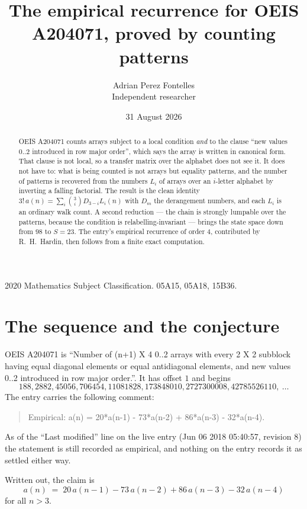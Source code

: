 \documentclass[11pt,a4paper]{article}
\title{The empirical recurrence for OEIS A204071, proved by counting patterns}
\author{Adrian Perez Fontelles\\ \small Independent researcher}
\date{31 August 2026}
\theoremstyle{plain}
\theoremstyle{definition}
\begin{document}
\maketitle

\begin{abstract}
OEIS A204071 counts arrays subject to a local condition \emph{and} to the clause ``new values
$0..2$ introduced in row major order'', which says the array is written in canonical
form. That clause is not local, so a transfer matrix over the alphabet does not see it. It
does not have to: what is being counted is not arrays but equality patterns, and the number
of patterns is recovered from the numbers $L_i$ of arrays over an $i$-letter alphabet by
inverting a falling factorial. The result is the clean identity
$3!\,a(n)=\sum_i\binom{3}{i}D_{3-i}L_i(n)$ with $D_m$ the derangement numbers,
and each $L_i$ is an ordinary walk count. A second reduction --- the chain is strongly
lumpable over the patterns, because the condition is relabelling-invariant --- brings the
state space down from $98$ to $S=23$. The entry's empirical recurrence of order
$4$, contributed by R.~H.~Hardin, then follows from a finite exact computation.
\end{abstract}

\noindent\small 2020 Mathematics Subject Classification. 05A15, 05A18, 15B36.\normalsize

\section{The sequence and the conjecture}

OEIS A204071 is ``Number of (n+1) X 4 0..2 arrays with every 2 X 2 subblock having equal diagonal elements or equal antidiagonal elements, and new values 0..2 introduced in row major order.''. It has offset $1$ and begins
\[
188, 2882, 45056, 706454, 11081828, 173848010, 2727300008, 42785526110,\ \dots
\]
The entry carries the following comment:
\begin{quote}\small
Empirical: a(n) = 20*a(n-1) - 73*a(n-2) + 86*a(n-3) - 32*a(n-4).
\end{quote}
As of the ``Last modified'' line on the live entry (Jun 06 2018 05:40:57, revision 8) the statement is
still recorded as empirical, and nothing on the entry records it as settled either way.

Written out, the claim is
\begin{equation}\label{eq:conj}
a(n)\;=\;20\,a(n-1) - 73\,a(n-2) + 86\,a(n-3) - 32\,a(n-4)
\end{equation}
for all $n>3$.
\end{document}
